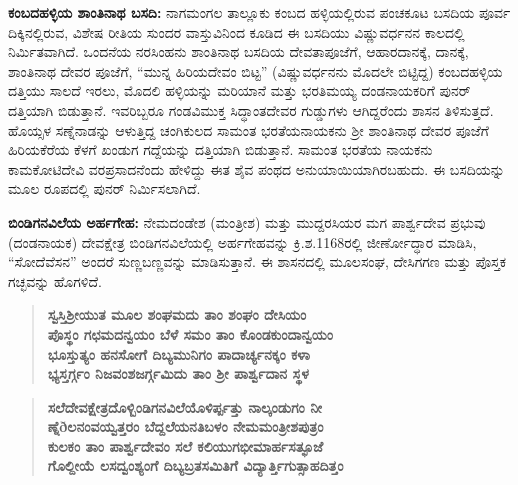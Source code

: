 \textbf{ಕಂಬದಹಳ್ಳಿಯ ಶಾಂತಿನಾಥ ಬಸದಿ:} ನಾಗಮಂಗಲ ತಾಲ್ಲೂಕು ಕಂಬದ ಹಳ್ಳಿಯಲ್ಲಿರುವ ಪಂಚಕೂಟ ಬಸದಿಯ ಪೂರ್ವ ದಿಕ್ಕಿನಲ್ಲಿರುವ, ವಿಶೇಷ ರೀತಿಯ ಸುಂದರ ವಾಸ್ತುವಿನಿಂದ ಕೂಡಿದ ಈ ಬಸದಿಯು ವಿಷ್ಣುವರ್ಧನನ ಕಾಲದಲ್ಲಿ ನಿರ್ಮಿತವಾಗಿದೆ. ಒಂದನೆಯ ನರಸಿಂಹನು ಶಾಂತಿನಾಥ ಬಸದಿಯ ದೇವತಾಪೂಜೆಗೆ, ಆಹಾರದಾನಕ್ಕೆ, ದಾನಕ್ಕೆ, ಶಾಂತಿನಾಥ ದೇವರ ಪೂಜೆಗೆ, “ಮುನ್ನ ಹಿರಿಯದೇವಂ ಬಿಟ್ಟ” (ವಿಷ್ಣುವರ್ಧನನು ಮೊದಲೇ ಬಿಟ್ಟಿದ್ದ) ಕಂಬದಹಳ್ಳಿಯ ದತ್ತಿಯು ಸಾಲದೆ ಇರಲು, ಮೊದಲಿ ಹಳ್ಳಿಯನ್ನು ಮರಿಯಾನೆ ಮತ್ತು ಭರತಿಮಯ್ಯ ದಂಡನಾಯಕರಿಗೆ ಪುನರ್​ದತ್ತಿಯಾಗಿ ಬಿಡುತ್ತಾನೆ. ಇವರಿಬ್ಬರೂ ಗಂಡವಿಮುಕ್ತ ಸಿದ್ಧಾಂತದೇವರ ಗುಡ್ಡುಗಳು ಆಗಿದ್ದರೆಂದು ಶಾಸನ ತಿಳಿಸುತ್ತದೆ. ಹೊಯ್ಸಳ ಸಣ್ನೆನಾಡನ್ನು ಆಳುತ್ತಿದ್ದ ಚಂಗಿಕುಲದ ಸಾಮಂತ ಭರತೆಯನಾಯಕನು ಶ‍್ರೀ ಶಾಂತಿನಾಥ ದೇವರ ಪೂಜೆಗೆ ಹಿರಿಯಕೆರೆಯ ಕೆಳಗೆ ಖಂಡುಗ ಗದ್ದೆಯನ್ನು ದತ್ತಿಯಾಗಿ ಬಿಡುತ್ತಾನೆ. ಸಾಮಂತ ಭರತೆಯ ನಾಯಕನು ಕಾಮಕೋಟಿದೇವಿ ವರಪ್ರಸಾದನೆಂದು ಹೇಳಿದ್ದು ಈತ ಶೈವ ಪಂಥದ ಅನುಯಾಯಿಯಾಗಿರಬಹುದು. ಈ ಬಸದಿಯನ್ನು ಮೂಲ ರೂಪದಲ್ಲಿ ಪುನರ್ ನಿರ್ಮಿಸಲಾಗಿದೆ.

\textbf{ಬಿಂಡಿಗನವಿಲೆಯ ಅರ್ಹಗೇಹ:} ನೇಮದಂಡೇಶ (ಮಂತ್ರೀಶ) ಮತ್ತು ಮುದ್ದರಸಿಯರ ಮಗ ಪಾರ್ಶ್ವದೇವ ಪ್ರಭುವು (ದಂಡನಾಯಕ) ದೇವಕ್ಷೇತ್ರ ಬಿಂಡಿಗನವಿಲೆಯಲ್ಲಿ ಅರ್ಹಗೇಹವನ್ನು ಕ್ರಿ.ಶ.1168ರಲ್ಲಿ ಜೀರ್ಣೋದ್ಧಾರ ಮಾಡಿಸಿ, “ಸೋದೆವೆಸನ” ಅಂದರೆ ಸುಣ್ಣಬಣ್ಣವನ್ನು ಮಾಡಿಸುತ್ತಾನೆ. ಈ ಶಾಸನದಲ್ಲಿ ಮೂಲಸಂಘ, ದೇಸಿಗಗಣ ಮತ್ತು ಪೊಸ್ತಕ ಗಚ್ಛವನ್ನು ಹೊಗಳಿದೆ.

\smallskip

\begin{verse}
\textbf{ಸ್ವಸ್ತಿಶ‍್ರೀಯುತ ಮೂಲ ಶಂಘಮದು ತಾಂ ಶಂಘಂ ದೇಸಿಯಂ} \\\textbf{ಪೊಸ್ಥಂ ಗಛಮದನ್ವಯಂ ಬೆಳೆ ಸಮಂ ತಾಂ ಕೊಂಡಕುಂದಾನ್ವಯಂ} \\\textbf{ಭೂಸ್ತುತ್ಯಂ ಹನಸೋಗೆ ದಿಬ್ಯಮುನಿಗಂ ಪಾದಾರ್ಚ್ಯನಕ್ಕಂ ಕಳಾ} \\\textbf{ಭ್ಯಸ್ತರ್ಗ್ಗಂ ನಿಜವಂಶಜರ್ಗ್ಗಮಿದು ತಾಂ ಶ‍್ರೀ ಪಾರ್ಶ್ವದಾನ ಸ್ಥಳ}
\end{verse}

\smallskip

\begin{verse}
\textbf{ಸಲೆದೇವಕ್ಷೇತ್ರದೊಳ್ಬಿಂಡಿಗನವಿಲೆಯೊಳಿರ್ಪ್ಪತ್ತು ನಾಲ್ಕಂಡುಗಂ ನೀ} \\\textbf{ಣ್ನೆðಲನಂವಯ್ವತ್ತರಂ ಬೆದ್ದಲೆಯನತಿಬಳಂ ನೇಮಮಂತ್ರೀಶಪುತ್ರಂ} \\\textbf{ಕುಲಕಂ ತಾಂ ಪಾರ್ಶ್ವದೇವಂ ಸಲೆ ಕಲಿಯುಗಭೀಮಾರ್ಹಸತ್ಫೂಜೆ} \\\textbf{ಗೊಲ್ದೀಯೆ ಲಸದ್ವಂಶ್ಯಂಗೆ ದಿಬ್ಯಬ್ರತಸಮಿತಿಗೆ ವಿದ್ಯಾರ್ತ್ತಿಗುತ್ಸಾಹದಿತ್ತಂ}
\end{verse}

